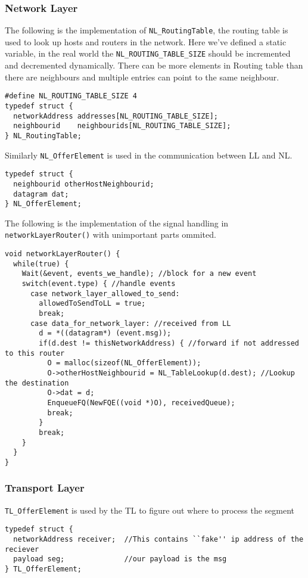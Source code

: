 \subsubsection{Network Layer}

The following is the implementation of \texttt{NL\_RoutingTable}, the routing table is used to look up hosts and routers in the network.
Here we've defined a static variable, in the real world the \texttt{NL\_ROUTING\_TABLE\_SIZE} should be incremented and decremented dynamically.
There can be more elements in Routing table than there are neighbours and multiple entries can point to the same neighbour.
\begin{lstlisting}
#define NL_ROUTING_TABLE_SIZE 4
typedef struct {
  networkAddress addresses[NL_ROUTING_TABLE_SIZE];
  neighbourid    neighbourids[NL_ROUTING_TABLE_SIZE];
} NL_RoutingTable;
\end{lstlisting}


Similarly \texttt{NL\_OfferElement} is used in the communication between LL and NL.
\begin{lstlisting}
typedef struct {
  neighbourid otherHostNeighbourid;
  datagram dat;
} NL_OfferElement;
\end{lstlisting}

The following is the implementation of the signal handling in \texttt{networkLayerRouter()} with unimportant parts ommited.
\begin{lstlisting}
void networkLayerRouter() {
  while(true) {
    Wait(&event, events_we_handle); //block for a new event
    switch(event.type) { //handle events
      case network_layer_allowed_to_send:
        allowedToSendToLL = true;
        break;
      case data_for_network_layer: //received from LL
        d = *((datagram*) (event.msg));
        if(d.dest != thisNetworkAddress) { //forward if not addressed to this router
          O = malloc(sizeof(NL_OfferElement));
          O->otherHostNeighbourid = NL_TableLookup(d.dest); //Lookup the destination
          O->dat = d;
          EnqueueFQ(NewFQE((void *)O), receivedQueue);
          break;
        }
        break;
    }
  }
}
\end{lstlisting}



\subsubsection{Transport Layer}

\texttt{TL\_OfferElement} is used by the TL to figure out where to process the segment
\begin{lstlisting}
typedef struct {
  networkAddress receiver;  //This contains ``fake'' ip address of the reciever
  payload seg;              //our payload is the msg
} TL_OfferElement;
\end{lstlisting}
\break

